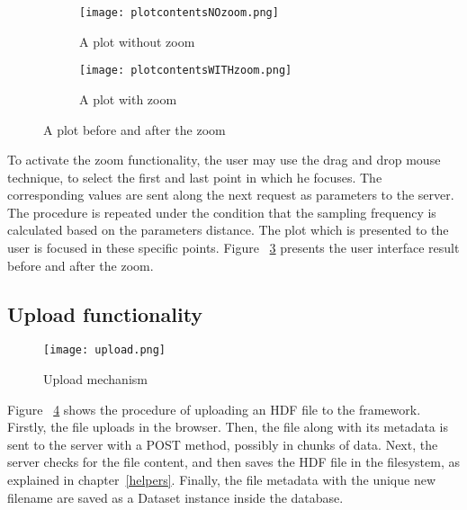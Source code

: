 \begin{figure}
\centering
\begin{subfigure}{1\textwidth}
  \centering
  \centerline{\texttt{[image: plotcontentsNOzoom.png]}}
  \caption{A plot without zoom}
  \label{fig:sub1}
\end{subfigure}
\begin{subfigure}{1\textwidth}
  \centering
  \centerline{\texttt{[image: plotcontentsWITHzoom.png]}}
  \caption{A plot with zoom}
  \label{fig:sub2}
\end{subfigure}
\caption{A plot before and after the zoom}
\label{fig:test}
\end{figure}

	To activate the zoom functionality, the user may use the drag and drop mouse technique, to select the first and last point in which he focuses. The corresponding values are sent along the next request as parameters to the server. The procedure is repeated  under the condition that the sampling frequency is calculated based on the parameters distance. The plot which is presented to the user is focused in these specific points.	Figure ~\ref{fig:test} presents the user interface result before and after the zoom.
	
\subsection{Upload functionality}
\begin{figure}
	\centerline{\texttt{[image: upload.png]}}
	\caption{Upload mechanism}
	\label{upload}
\end{figure}
Figure ~\ref{upload} shows the procedure of uploading an HDF file to the framework. Firstly, the file uploads in the browser. Then, the file along with its metadata is sent to the server with a POST method, possibly in chunks of data.  Next, the server checks for the file content, and then saves the HDF file in the filesystem, as explained in chapter~\ref{helpers}. Finally, the file metadata with the unique new filename are saved as a Dataset instance inside the database.

